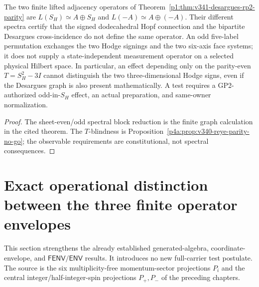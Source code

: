 \documentclass[12pt,a4paper]{article}
\begin{document}
\begin{proposition}
\label{p4a:prop:v341-doublecover-parity-response}
The two finite lifted adjacency operators of
Theorem~\ref{p1:thm:v341-desargues-rp2-parity} are
$L(S_H)\simeq A\oplus S_H$ and
$L(-A)\simeq A\oplus(-A)$.  Their different spectra
certify that the signed dodecahedral Hopf connection and the
bipartite Desargues cross-incidence do not define the same
operator.  An odd five-label permutation exchanges the two
Hodge signings and the two six-axis face systems; it does not
supply a state-independent measurement operator on a selected
physical Hilbert space.  In particular, an effect depending only
on the parity-even $T=S_H^2-3I$ cannot distinguish the two
three-dimensional Hodge signs, even if the Desargues graph is
also present mathematically.  A test requires a GP2-authorized
odd-in-$S_H$ effect, an actual preparation, and same-owner
normalization.
\end{proposition}
\begin{proof}
The sheet-even/odd spectral block reduction is the finite graph
calculation in the cited theorem.  The $T$-blindness is
Proposition~\ref{p4a:prop:v340-reye-parity-no-go};
the observable requirements are constitutional, not spectral
consequences.
\end{proof}



\section{Exact operational distinction between the three finite operator envelopes}
\label{p4a:sec:v347-operational-resolution}
This section strengthens the already established generated-algebra,
coordinate-envelope, and \(\mathsf{FENV}/\mathsf{ENV}\) results.  It
introduces no new full-carrier test postulate.  The source is the six
multiplicity-free momentum-sector projections \(P_i\) and the central
integer/half-integer-spin projections \(P_+,P_-\) of the preceding chapters.
\end{document}
